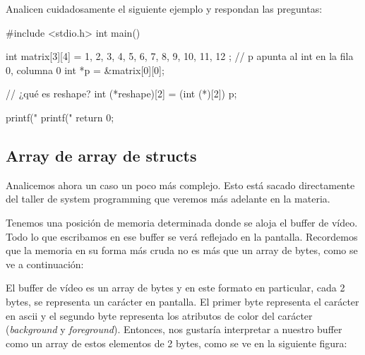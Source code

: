 \documentclass[]{scrartcl}
\begin{document}
\begin{exbox}
Analicen cuidadosamente el siguiente ejemplo y respondan las preguntas:
\begin{cbox}[]{}
  #include <stdio.h>
  int main() {
      int matrix[3][4] = {
          {1, 2, 3, 4},
          {5, 6, 7, 8},
          {9, 10, 11, 12}
          };
      // p apunta al int en la fila 0, columna 0
      int *p = &matrix[0][0]; 

      // ¿qué es reshape?
      int (*reshape)[2] = (int (*)[2]) p; 

      printf("%
      printf("%
      return 0;
  }
\end{cbox}
\end{exbox}

\subsection*{Array de array de structs}

Analicemos ahora un caso un poco más complejo. Esto está sacado directamente del taller de system programming que veremos más adelante en la materia. 

Tenemos una posición de memoria determinada donde se aloja el buffer de vídeo. Todo lo que escribamos en ese buffer se verá reflejado en la pantalla. Recordemos que la memoria en su forma más cruda no es más que un array de bytes, como se ve a continuación:

\begin{center}
  \noindent {}
  \label{fig:videobuffer01}
\end{center}

El buffer de vídeo es un array de bytes y en este formato en particular, cada 2 bytes, se representa un carácter en pantalla. El primer byte representa el carácter en ascii y el segundo byte representa los atributos de color del carácter (\textit{background} y \textit{foreground}). Entonces, nos gustaría interpretar a nuestro buffer como un array de estos elementos de 2 bytes, como se ve en la siguiente figura:
\end{document}
